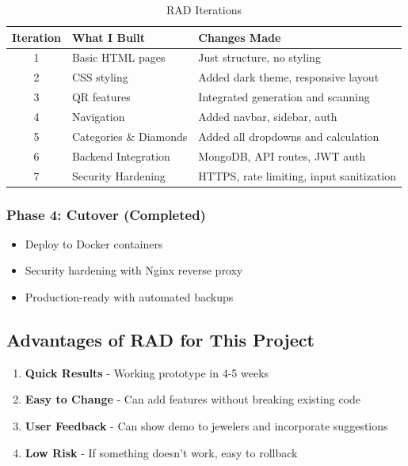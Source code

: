 \documentclass[12pt,a4paper]{article}
\begin{document}
\begin{table}[H]
\centering
\begin{tabular}{|c|l|p{7cm}|}
\hline
\textbf{Iteration} & \textbf{What I Built} & \textbf{Changes Made} \\
\hline
1 & Basic HTML pages & Just structure, no styling \\
\hline
2 & CSS styling & Added dark theme, responsive layout \\
\hline
3 & QR features & Integrated generation and scanning \\
\hline
4 & Navigation & Added navbar, sidebar, auth \\
\hline
5 & Categories \& Diamonds & Added all dropdowns and calculation \\
\hline
6 & Backend Integration & MongoDB, API routes, JWT auth \\
\hline
7 & Security Hardening & HTTPS, rate limiting, input sanitization \\
\hline
\end{tabular}
\caption{RAD Iterations}
\end{table}

\subsubsection{Phase 4: Cutover (Completed)}
\begin{itemize}
    \item Deploy to Docker containers
    \item Security hardening with Nginx reverse proxy
    \item Production-ready with automated backups
\end{itemize}

\subsection{Advantages of RAD for This Project}

\begin{enumerate}
    \item \textbf{Quick Results} - Working prototype in 4-5 weeks
    \item \textbf{Easy to Change} - Can add features without breaking existing code
    \item \textbf{User Feedback} - Can show demo to jewelers and incorporate suggestions
    \item \textbf{Low Risk} - If something doesn't work, easy to rollback
\end{enumerate}
\end{document}
